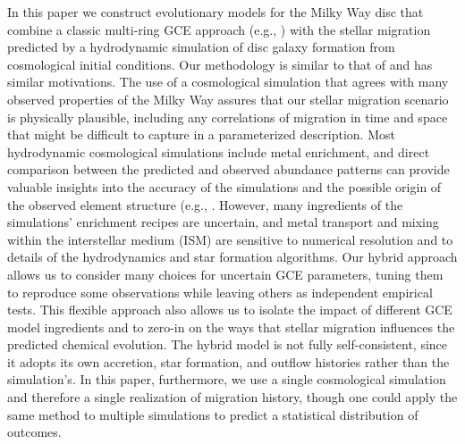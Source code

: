 In this paper we construct evolutionary models for the Milky Way disc that
combine a classic multi-ring GCE approach (e.g.,
\citealt{Matteucci1989,Wyse1989,Prantzos1995})
with the stellar migration predicted by a hydrodynamic simulation of disc
galaxy formation from cosmological initial conditions.  Our methodology
is similar to that of \cite{Minchev2013,Minchev2014} and has similar 
motivations.  The use of a cosmological simulation that agrees with
many observed properties of the Milky Way assures that our stellar 
migration scenario is physically plausible, including any correlations 
of migration in time and space that might be difficult to capture in a
parameterized description.  Most hydrodynamic cosmological simulations include
metal enrichment, and direct comparison between the predicted and observed
abundance patterns can provide valuable insights into the accuracy of the
simulations and the possible origin of the observed element structure (e.g., 
\citealt{Mackereth2017,Grand2018,Buck2020,Vincenzo2020}.
However, many ingredients of the simulations' enrichment recipes are uncertain,
and metal transport and mixing within the interstellar medium (ISM) are
sensitive to numerical resolution and to details of the hydrodynamics and
star formation algorithms.  Our hybrid approach allows us to consider many
choices for uncertain GCE parameters, tuning them to reproduce some 
observations while leaving others as independent empirical tests.
This flexible approach also allows us to isolate the impact of different
GCE model ingredients and to zero-in on the ways that stellar migration
influences the predicted chemical evolution.  
The hybrid model is not fully self-consistent, since it adopts its own 
accretion, star formation, and outflow histories rather than the simulation's.
In this paper, furthermore, we use a single cosmological simulation and 
therefore a single realization of migration history, though one could
apply the same method to multiple simulations to predict a statistical
distribution of outcomes.

